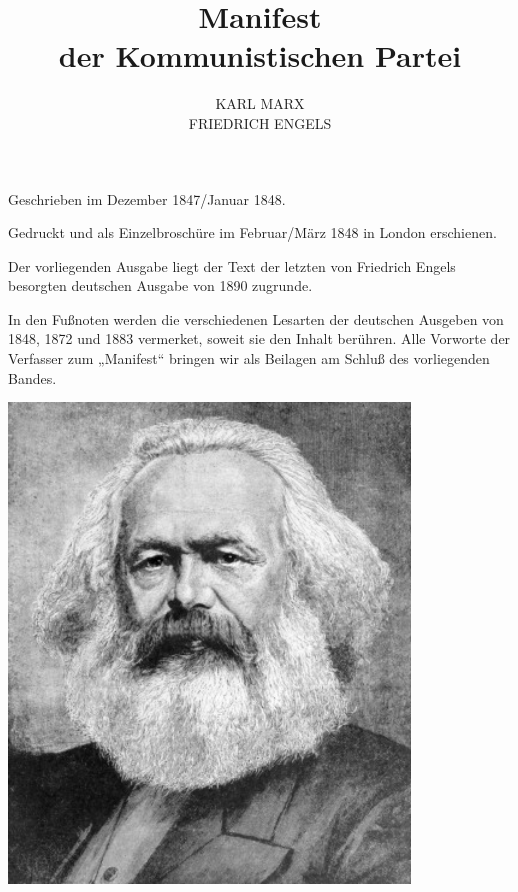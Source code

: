 \documentclass[letterpaper]{article}
\title{\marginpar{459}\Huge Manifest\\der Kommunistischen Partei}
\author{KARL MARX\\FRIEDRICH ENGELS}
\date{}
\begin{document}
\maketitle
\thispagestyle{empty}
\newpage

\tableofcontents
\thispagestyle{empty}

\newpage
\thispagestyle{empty}

\begin{center}
Geschrieben im Dezember 1847/Januar 1848.

Gedruckt und als Einzelbroschüre im Februar/März 1848 in London erschienen.

Der vorliegenden Ausgabe liegt der Text der letzten von Friedrich Engels besorgten deutschen Ausgabe von 1890 zugrunde.
\end{center}

\begin{adjustwidth}{2.5cm}{2.5cm}
\vfill In den Fußnoten werden die verschiedenen Lesarten der deutschen Ausgeben von 1848, 1872 und 1883 vermerket, soweit sie den Inhalt berühren. Alle Vorworte der Verfasser zum „Manifest“ bringen wir als Beilagen am Schluß des vorliegenden Bandes.
\end{adjustwidth}

\newpage
\thispagestyle{empty}
\vspace*{80pt}
\centerline{
\includegraphics[width=0.8\textwidth]{0111207237-Marx.jpg}
}
\end{document}
